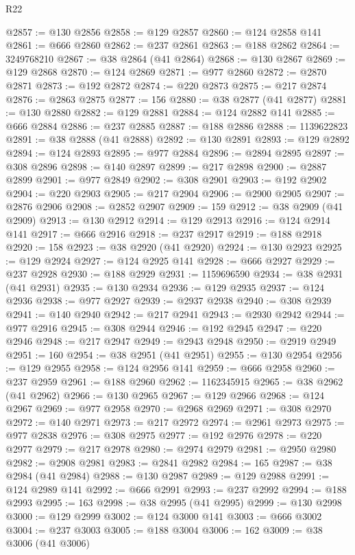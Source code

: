 \begin{lexlean}{R22}
\begin{coremodule}
@2857 := @130 @2856
@2858 := @129 @2857
@2860 := @124 @2858 @141
@2861 := @666 @2860
@2862 := @237 @2861
@2863 := @188 @2862
@2864 := 3249768210
@2867 := @38 @2864 (@41 @2864)
@2868 := @130 @2867
@2869 := @129 @2868
@2870 := @124 @2869
@2871 := @977 @2860
@2872 := @2870 @2871
@2873 := @192 @2872
@2874 := @220 @2873
@2875 := @217 @2874
@2876 := @2863 @2875
@2877 := 156
@2880 := @38 @2877 (@41 @2877)
@2881 := @130 @2880
@2882 := @129 @2881
@2884 := @124 @2882 @141
@2885 := @666 @2884
@2886 := @237 @2885
@2887 := @188 @2886
@2888 := 1139622823
@2891 := @38 @2888 (@41 @2888)
@2892 := @130 @2891
@2893 := @129 @2892
@2894 := @124 @2893
@2895 := @977 @2884
@2896 := @2894 @2895
@2897 := @308 @2896
@2898 := @140 @2897
@2899 := @217 @2898
@2900 := @2887 @2899
@2901 := @977 @2849
@2902 := @308 @2901
@2903 := @192 @2902
@2904 := @220 @2903
@2905 := @217 @2904
@2906 := @2900 @2905
@2907 := @2876 @2906
@2908 := @2852 @2907
@2909 := 159
@2912 := @38 @2909 (@41 @2909)
@2913 := @130 @2912
@2914 := @129 @2913
@2916 := @124 @2914 @141
@2917 := @666 @2916
@2918 := @237 @2917
@2919 := @188 @2918
@2920 := 158
@2923 := @38 @2920 (@41 @2920)
@2924 := @130 @2923
@2925 := @129 @2924
@2927 := @124 @2925 @141
@2928 := @666 @2927
@2929 := @237 @2928
@2930 := @188 @2929
@2931 := 1159696590
@2934 := @38 @2931 (@41 @2931)
@2935 := @130 @2934
@2936 := @129 @2935
@2937 := @124 @2936
@2938 := @977 @2927
@2939 := @2937 @2938
@2940 := @308 @2939
@2941 := @140 @2940
@2942 := @217 @2941
@2943 := @2930 @2942
@2944 := @977 @2916
@2945 := @308 @2944
@2946 := @192 @2945
@2947 := @220 @2946
@2948 := @217 @2947
@2949 := @2943 @2948
@2950 := @2919 @2949
@2951 := 160
@2954 := @38 @2951 (@41 @2951)
@2955 := @130 @2954
@2956 := @129 @2955
@2958 := @124 @2956 @141
@2959 := @666 @2958
@2960 := @237 @2959
@2961 := @188 @2960
@2962 := 1162345915
@2965 := @38 @2962 (@41 @2962)
@2966 := @130 @2965
@2967 := @129 @2966
@2968 := @124 @2967
@2969 := @977 @2958
@2970 := @2968 @2969
@2971 := @308 @2970
@2972 := @140 @2971
@2973 := @217 @2972
@2974 := @2961 @2973
@2975 := @977 @2838
@2976 := @308 @2975
@2977 := @192 @2976
@2978 := @220 @2977
@2979 := @217 @2978
@2980 := @2974 @2979
@2981 := @2950 @2980
@2982 := @2908 @2981
@2983 := @2841 @2982
@2984 := 165
@2987 := @38 @2984 (@41 @2984)
@2988 := @130 @2987
@2989 := @129 @2988
@2991 := @124 @2989 @141
@2992 := @666 @2991
@2993 := @237 @2992
@2994 := @188 @2993
@2995 := 163
@2998 := @38 @2995 (@41 @2995)
@2999 := @130 @2998
@3000 := @129 @2999
@3002 := @124 @3000 @141
@3003 := @666 @3002
@3004 := @237 @3003
@3005 := @188 @3004
@3006 := 162
@3009 := @38 @3006 (@41 @3006)

\end{coremodule}
\end{lexlean}
